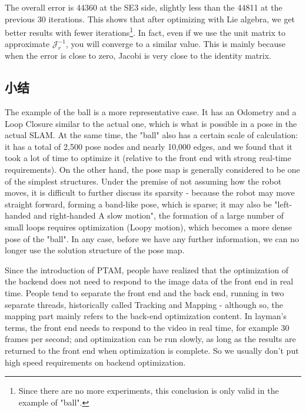     The overall error is 44360 at the SE3 side, slightly less than the 44811 at the previous 30 iterations. This shows that after optimizing with Lie algebra, we get better results with fewer iterations\footnote{ Since there are no more experiments, this conclusion is only valid in the example of "ball". }. In fact, even if we use the unit matrix to approximate $\bm{\mathcal{J}}_r^{-1}$, you will converge to a similar value. This is mainly because when the error is close to zero, Jacobi is very close to the identity matrix.
    
\subsection{小结}
The example of the ball is a more representative case. It has an Odometry and a Loop Closure similar to the actual one, which is what is possible in a pose in the actual SLAM. At the same time, the "ball" also has a certain scale of calculation: it has a total of 2,500 pose nodes and nearly 10,000 edges, and we found that it took a lot of time to optimize it (relative to the front end with strong real-time requirements). On the other hand, the pose map is generally considered to be one of the simplest structures. Under the premise of not assuming how the robot moves, it is difficult to further discuss its sparsity - because the robot may move straight forward, forming a band-like pose, which is sparse; it may also be "left-handed and right-handed A slow motion", the formation of a large number of small loops requires optimization (Loopy motion), which becomes a more dense pose of the "ball". In any case, before we have any further information, we can no longer use the solution structure of the pose map.

Since the introduction of PTAM\textsuperscript{\cite{Klein2007}}, people have realized that the optimization of the backend does not need to respond to the image data of the front end in real time. People tend to separate the front end and the back end, running in two separate threads, historically called Tracking and Mapping - although so, the mapping part mainly refers to the back-end optimization content. In layman's terms, the front end needs to respond to the video in real time, for example 30 frames per second; and optimization can be run slowly, as long as the results are returned to the front end when optimization is complete. So we usually don't put high speed requirements on backend optimization.

    
    
